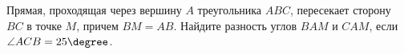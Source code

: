 \begin{ex}
	\begin{condition}
		Прямая, проходящая через вершину \( A \) треугольника \( ABC \), пересекает сторону \( BC  \) в точке \( M  \), причем \( BM = AB \). Найдите разность углов \( BAM  \) и \( CAM  \), если \( \angle ACB = 25\degree\).
	\end{condition}
\end{ex}